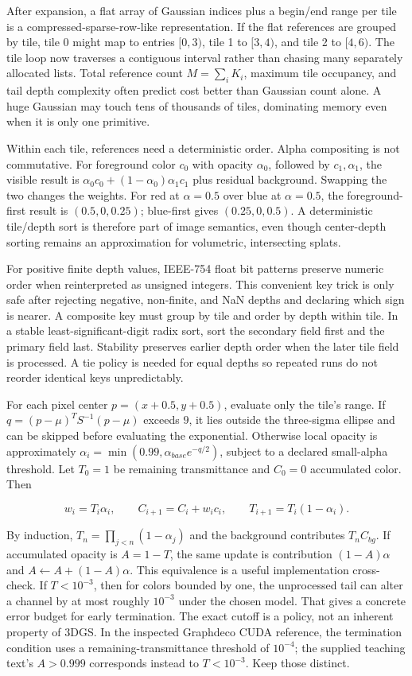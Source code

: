 After expansion, a flat array of Gaussian indices plus a begin/end range per tile is a compressed-sparse-row-like representation. If the flat references are grouped by tile, tile 0 might map to entries \([0,3)\), tile 1 to \([3,4)\), and tile 2 to \([4,6)\). The tile loop now traverses a contiguous interval rather than chasing many separately allocated lists. Total reference count \(M=\sum_iK_i\), maximum tile occupancy, and tail depth complexity often predict cost better than Gaussian count alone. A huge Gaussian may touch tens of thousands of tiles, dominating memory even when it is only one primitive.

Within each tile, references need a deterministic order. Alpha compositing is not commutative. For foreground color \(c_0\) with opacity \(\alpha_0\), followed by \(c_1,\alpha_1\), the visible result is \(\alpha_0c_0+(1-\alpha_0)\alpha_1c_1\) plus residual background. Swapping the two changes the weights. For red at \(\alpha=0.5\) over blue at \(\alpha=0.5\), the foreground-first result is \((0.5,0,0.25)\); blue-first gives \((0.25,0,0.5)\). A deterministic tile/depth sort is therefore part of image semantics, even though center-depth sorting remains an approximation for volumetric, intersecting splats.

For positive finite depth values, IEEE-754 float bit patterns preserve numeric order when reinterpreted as unsigned integers. This convenient key trick is only safe after rejecting negative, non-finite, and NaN depths and declaring which sign is nearer. A composite key must group by tile and order by depth within tile. In a stable least-significant-digit radix sort, sort the secondary field first and the primary field last. Stability preserves earlier depth order when the later tile field is processed. A tie policy is needed for equal depths so repeated runs do not reorder identical keys unpredictably.

For each pixel center \(p=(x+0.5,y+0.5)\), evaluate only the tile's range. If \(q=(p-\mu)^TS^{-1}(p-\mu)\) exceeds \(9\), it lies outside the three-sigma ellipse and can be skipped before evaluating the exponential. Otherwise local opacity is approximately \(\alpha_i=\min(0.99,\alpha_{base}e^{-q/2})\), subject to a declared small-alpha threshold. Let \(T_0=1\) be remaining transmittance and \(C_0=0\) accumulated color. Then

\[
w_i=T_i\alpha_i,\qquad C_{i+1}=C_i+w_ic_i,\qquad T_{i+1}=T_i(1-\alpha_i).
\]

By induction, \(T_n=\prod_{j<n}(1-\alpha_j)\) and the background contributes \(T_nC_{bg}\). If accumulated opacity is \(A=1-T\), the same update is contribution \((1-A)\alpha\) and \(A\gets A+(1-A)\alpha\). This equivalence is a useful implementation cross-check. If \(T<10^{-3}\), then for colors bounded by one, the unprocessed tail can alter a channel by at most roughly \(10^{-3}\) under the chosen model. That gives a concrete error budget for early termination. The exact cutoff is a policy, not an inherent property of 3DGS. In the inspected Graphdeco CUDA reference, the termination condition uses a remaining-transmittance threshold of \(10^{-4}\); the supplied teaching text's \(A>0.999\) corresponds instead to \(T<10^{-3}\). Keep those distinct.

